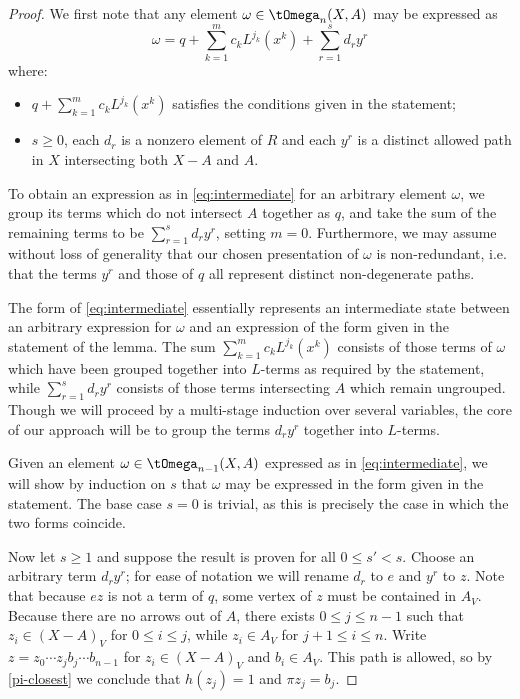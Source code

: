 \begin{proof}
We first note that any element $\omega \in \tOmega_n(X,A)$ may be expressed as
\begin{equation}\label{eq:intermediate} \omega=
q + \sum_{k=1}^m c_k L^{j_k}(x^k) + \sum_{r = 1}^{s} d_r y^r
\end{equation}
where:
\begin{itemize}
    \item $q + \sum_{k=1}^m c_k L^{j_k}(x^k)$ satisfies the conditions given in the statement;
    \item $s \geq 0$, each $d_r$ is a nonzero element of $R$ and each $y^r$ is a distinct allowed path in $X$ intersecting both $X - A$ and $A$.
\end{itemize}
To obtain an expression as in \cref{eq:intermediate} for an arbitrary element $\omega$, we group its terms which do not intersect $A$ together as $q$, and take the sum of the remaining terms to be $\sum_{r = 1}^{s} d_r y^r$, setting $m = 0$. Furthermore,  we may assume without loss of generality that our chosen presentation of $\omega$ is non-redundant, i.e.  that the terms $y^r$ and those of $q$ all represent distinct non-degenerate paths.

The form of \cref{eq:intermediate} essentially represents an intermediate state between an arbitrary expression for $\omega$ and an expression of the form given in the statement of the lemma. The sum $\sum_{k=1}^m c_k L^{j_k}(x^k)$ consists of those terms of $\omega$ which have been grouped together into $L$-terms as required by the statement, while $\sum_{r = 1}^{s} d_r y^r$ consists of those terms intersecting $A$ which remain ungrouped. Though we will proceed by a multi-stage induction over several variables, the core of our approach will be to group the terms $d_r y^r$ together into $L$-terms. 

Given an element $\omega \in \tOmega_{n-1}(X,A)$ expressed as in \cref{eq:intermediate}, we will show by induction on $s$ that $\omega$ may be expressed in the form given in the statement. The base case $s = 0$ is trivial, as this is precisely the case in which the two forms coincide.

Now let $s \geq 1$ and suppose the result is proven for all $0 \leq s' < s$. Choose an arbitrary term $d_r y^r$; for ease of notation we will rename $d_r$ to $e$ and $y^r$ to $z$. Note that because $e z$ is not a term of $q$, some vertex of $z$ must be contained in $A_V$. Because there are no arrows out of $A$, there exists $0 \leq j \leq n-1$ such that $z_i \in (X-A)_V$ for $0 \leq i \leq j$, while $z_i \in A_V$ for $j + 1 \leq i \leq n$. Write $z = z_0 \cdots z_j b_j \cdots b_{n-1}$ for $z_i \in (X-A)_V$ and $b_i \in A_V$. This path is allowed, so by \cref{pi-closest} we conclude that $h(z_j) = 1$ and $\pi z_j = b_j$.


\end{proof}
